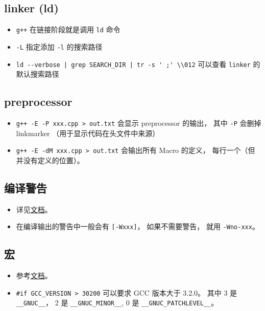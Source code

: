 \subsection{linker (ld)}
\begin{itemize}
\item \verb|g++| 在链接阶段就是调用 \verb|ld| 命令
\item \verb|-L| 指定添加 \verb|-l| 的搜索路径
\item \verb`ld --verbose | grep SEARCH_DIR | tr -s ' ;' \\012` 可以查看 \verb|linker| 的默认搜索路径
\end{itemize}

\subsection{preprocessor}
\begin{itemize}
\item \verb|g++ -E -P xxx.cpp > out.txt| 会显示 preprocessor 的输出， 其中 \verb|-P| 会删掉 linkmarker （用于显示代码在头文件中来源）
\item \verb|g++ -E -dM xxx.cpp > out.txt| 会输出所有 Macro 的定义， 每行一个（但并没有定义的位置）。
\end{itemize}

\subsection{编译警告}
\begin{itemize}
\item 详见\href{https://gcc.gnu.org/onlinedocs/gcc/Warning-Options.html}{文档}。
\item 在编译输出的警告中一般会有 \verb|[-Wxxx]|， 如果不需要警告， 就用 \verb|-Wno-xxx|。
\end{itemize}

\subsection{宏}
\begin{itemize}
\item 参考\href{https://gcc.gnu.org/onlinedocs/cpp/Common-Predefined-Macros.html}{文档}。
\item \verb|#if GCC_VERSION > 30200| 可以要求 GCC 版本大于 3.2.0。 其中 3 是 \verb|__GNUC__|， 2 是 \verb|__GNUC_MINOR__|,  0 是 \verb|__GNUC_PATCHLEVEL__|。
\end{itemize}


